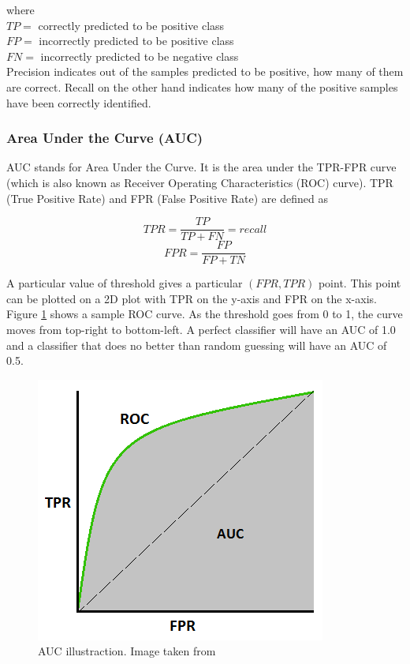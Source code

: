 where \\ 
$TP=$ correctly predicted to be positive class\\ 
$FP=$ incorrectly predicted to be positive class\\
$FN=$ incorrectly predicted to be negative class \\

Precision indicates out of the samples predicted to be positive, how many of them are correct. Recall on the other hand indicates how many of the positive samples have been correctly identified. 

\subsubsection{Area Under the Curve (AUC)}
AUC stands for Area Under the Curve. It is the area under the TPR-FPR curve (which is also known as Receiver Operating Characteristics (ROC) curve). TPR (True Positive Rate) and FPR (False Positive Rate) are defined as 

$$ TPR = \frac{TP}{TP + FN} = recall$$
$$ FPR = \frac{FP}{FP + TN}$$

A particular value of threshold gives a particular $(FPR,TPR)$ point. This point can be plotted on a 2D plot with TPR on the y-axis and FPR on the x-axis. Figure \ref{fig:auc} shows a sample ROC curve. As the threshold goes from 0 to 1, the curve moves from top-right to bottom-left. A perfect classifier will have an AUC of 1.0 and a classifier that does no better than random guessing will have an AUC of 0.5. 


\begin{figure}
    \centering
    \includegraphics[width=0.6\linewidth]{images/auc.PNG}
    \caption[AUC illustraction]{AUC illustraction. Image taken from \cite{auc}}
    \label{fig:auc}
\end{figure}


